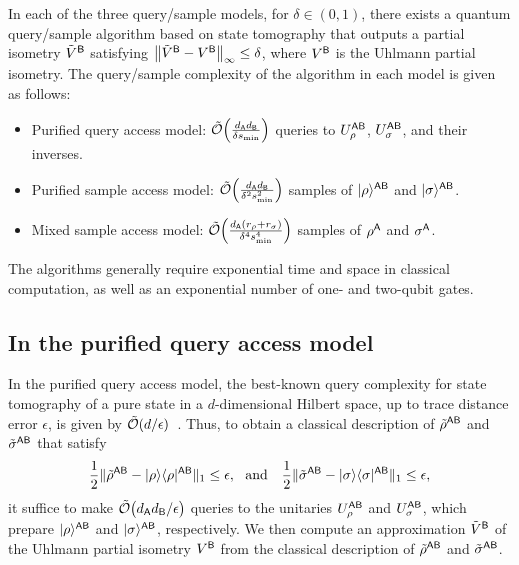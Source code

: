 \begin{proposition}
    In each of the three query/sample models, for $\delta \in (0, 1)$, there exists a quantum query/sample algorithm based on state tomography that outputs a partial isometry $\tilde{V}^{{\mathsf{B}}}$ satisfying $\big\|\tilde{V}^{\mathsf{B}} - V^{\mathsf{B}}\big\|_\infty \leq \delta$, where $V^{\mathsf{B}}$ is the Uhlmann partial isometry.
    The query/sample complexity of the algorithm in each model is given as follows:
\begin{itemize}
\item Purified query access model: $\tilde{{\mathcal{O}}}\Big(\frac{d_{\mathsf{A}} d_{\mathsf{B}}}{\delta s_{\rm min}}\Big)$ queries to $U_\rho^{{\mathsf{A}}{\mathsf{B}}}$, $U_\sigma^{{\mathsf{A}}{\mathsf{B}}}$, and their inverses.
\item Purified sample access model: $\tilde{{\mathcal{O}}}\Big(\frac{d_{\mathsf{A}} d_{\mathsf{B}}}{\delta^2 s_{\rm min}^2}\Big)$ samples of $|\rho\rangle^{{\mathsf{A}}{\mathsf{B}}}$ and $|\sigma\rangle^{{\mathsf{A}}{\mathsf{B}}}$.
\item Mixed sample access model: $\tilde{{\mathcal{O}}}\Big(\frac{d_{\mathsf{A}} (r_\rho + r_\sigma)}{\delta^4 s_{\rm min}^4}\Big)$ samples of $\rho^{\mathsf{A}}$ and $\sigma^{\mathsf{A}}$.
\end{itemize}
The algorithms generally require exponential time and space in classical computation, as well as an exponential number of one- and two-qubit gates.
\end{proposition}







\subsection{In the purified query access model}
\label{sec:tomography based purif query}





In the purified query access model, the best-known query complexity for state tomography of a pure state in a $d$-dimensional Hilbert space, up to trace distance error $\epsilon$, is given by $\tilde{{\mathcal{O}}}(d/\epsilon)$~\cite{Apeldoorn2023TomoPurifQuery}.
Thus, to obtain a classical description of $\tilde{\rho}^{{\mathsf{A}}{\mathsf{B}}}$ and $\tilde{\sigma}^{{\mathsf{A}}{\mathsf{B}}}$ that satisfy
\begin{align}
\label{eq:tomography descp. error}
    \frac{1}{2}\|\tilde{\rho}^{{\mathsf{A}}{\mathsf{B}}} - |\rho\rangle\langle\rho|^{{\mathsf{A}}{\mathsf{B}}}\|_1 \leq \epsilon, 
    \ \ \text{and} \ \ \  
    \frac{1}{2}\|\tilde{\sigma}^{{\mathsf{A}}{\mathsf{B}}} - |\sigma\rangle\langle\sigma|^{{\mathsf{A}}{\mathsf{B}}}\|_1 \leq \epsilon,
\end{align}
it suffice to make $\tilde{{\mathcal{O}}}\big(d_{\mathsf{A}} d_{\mathsf{B}}/\epsilon\big)$ queries to the unitaries $U_\rho^{{\mathsf{A}}{\mathsf{B}}}$ and $U_\sigma^{{\mathsf{A}}{\mathsf{B}}}$, which prepare $|\rho\rangle^{{\mathsf{A}}{\mathsf{B}}}$ and $|\sigma\rangle^{{\mathsf{A}}{\mathsf{B}}}$, respectively.
We then compute an approximation $\tilde{V}^{\mathsf{B}}$ of the Uhlmann partial isometry $V^{\mathsf{B}}$ from the classical description of $\tilde{\rho}^{{\mathsf{A}}{\mathsf{B}}}$ and $\tilde{\sigma}^{{\mathsf{A}}{\mathsf{B}}}$.


